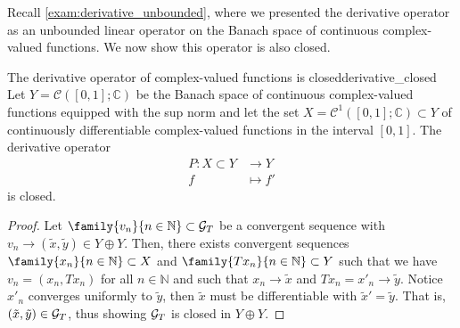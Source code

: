 Recall \cref{exam:derivative_unbounded}, where we presented the derivative operator as an unbounded linear operator on the Banach space of continuous complex-valued functions. We now show this operator is also closed.
\begin{example}{The derivative operator of complex-valued functions is closed}{derivative_closed}
    Let \(Y = \mathcal{C}([0,1]; \mathbb{C})\) be the Banach space of continuous complex-valued functions equipped with the sup norm and let the set \(X = \mathcal{C}^1([0,1];\mathbb{C})\subset Y\) of continuously differentiable complex-valued functions in the interval \([0,1]\). The derivative operator
    \begin{align*}
        P : X \subset Y &\to Y\\
            f &\mapsto f'
    \end{align*}
    is closed.
\end{example}
\begin{proof}
    Let \(\family{v_n}{n \in \mathbb{N}} \subset \graph{T}\) be a convergent sequence with \(v_n \to (\tilde{x}, \tilde{y}) \in Y \oplus Y\). Then, there exists convergent sequences \(\family{x_n}{n \in \mathbb{N}} \subset X\) and \(\family{Tx_n}{n \in \mathbb{N}} \subset Y\) such that we have \(v_n = (x_n, Tx_n)\) for all \(n \in \mathbb{N}\) and such that \(x_n \to \tilde{x}\) and \(Tx_n = x'_n \to \tilde{y}\). Notice \(x'_n\) converges uniformly to \(\tilde{y}\), then \(\tilde{x}\) must be differentiable with \(\tilde{x}' = \tilde{y}\). That is, \((\tilde{x}, \tilde{y}) \in \mathcal{G}_{T}\), thus showing \(\mathcal{G}_{T}\) is closed in \(Y \oplus Y\).
\end{proof}

